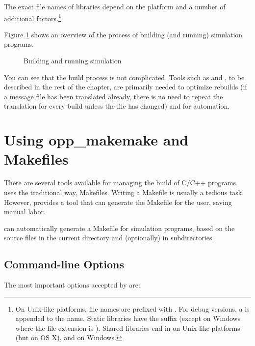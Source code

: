 The exact file names of libraries depend on the platform and a number of
additional factors.\footnote{On Unix-like platforms, file names are
prefixed with . For debug versions, a  is appended to the
name. Static libraries have the  suffix (except on Windows where
the file extension is ). Shared libraries end in  on
Unix-like platforms (but  on OS X), and  on Windows.}

Figure \ref{fig:ch-build:workflow} shows an overview of the process of
building (and running) simulation programs.

\begin{figure}[htbp]
  \begin{center}
    
    \caption{Building and running simulation}
    \label{fig:ch-build:workflow}
  \end{center}
\end{figure}

You can see that the build process is not complicated. Tools such as
 and , to be described in the rest of the
chapter, are primarily needed to optimize rebuilds (if a message file has been
translated already, there is no need to repeat the translation for every build
unless the file has changed) and for automation.
 

\section{Using opp\_makemake and Makefiles}
\label{sec:build-sim-progs:opp-makemake}

There are several tools available for managing the build of C/C++ programs.
{\opp} uses the traditional way, Makefiles. Writing a Makefile is usually a
tedious task. However, {\opp} provides a tool that can generate the
Makefile for the user, saving manual labor.

 can automatically generate a Makefile for simulation
programs, based on the source files in the current directory and (optionally)
in subdirectories.

\subsection{Command-line Options}
\label{sec:build-sim-progs:makemake-options}

The most important options accepted by  are:

